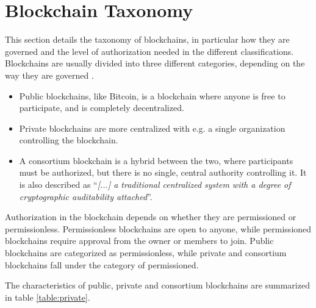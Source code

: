\section{Blockchain Taxonomy}
This section details the taxonomy of blockchains, in particular how they are governed and the level of authorization needed in the different classifications.
Blockchains are usually divided into three different categories, depending on the way they are governed \cite{Ethereum_pub_priv, taxonomy, Zheng_overview}.

\begin{itemize}
\item Public blockchains, like Bitcoin, is a blockchain where anyone is free to participate, and is completely decentralized.
\item Private blockchains are more centralized with e.g. a single organization controlling the blockchain.
\item A consortium blockchain is a hybrid between the two, where participants must be authorized, but there is no single, central authority controlling it. It is also described as \enquote{\textit{[...] a traditional centralized system with a degree of cryptographic auditability attached}}\cite{Ethereum_pub_priv}.
\end{itemize}

Authorization in the blockchain depends on whether they are  permissioned or permissionless. Permissionless blockchains are open to anyone, while permissioned blockchains require approval from the owner or members to join. Public blockchains are categorized as permissionless, while private and consortium blockchains fall under the category of permissioned.

The characteristics of public, private and consortium blockchains are summarized in table \ref{table:private}.

